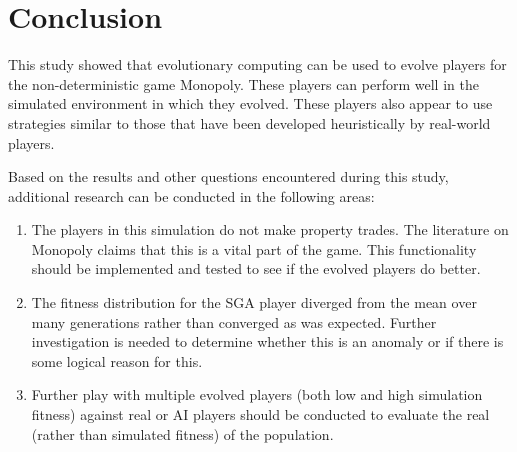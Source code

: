 \clearpage
\chapter{Conclusion}\label{chap:conclusion}

This study showed that evolutionary computing can be used to evolve players for
the non-deterministic game Monopoly. These players can perform well in the
simulated environment in which they evolved. These players also appear to use
strategies similar to those that have been developed heuristically by real-world
players.

Based on the results and other questions encountered during this study,
additional research can be conducted in the following areas:

\begin{enumerate}
  \item The players in this simulation do not make property trades. The
  literature on Monopoly claims that this is a vital part of the game. This
  functionality should be implemented and tested to see if the evolved players
  do better.
  \item The fitness distribution for the SGA player diverged from the mean over
  many generations rather than converged as was expected. Further investigation
  is needed to determine whether this is an anomaly or if there is some logical
  reason for this.
  \item Further play with multiple evolved players (both low and high simulation
  fitness) against real or AI players should be conducted to evaluate the real
  (rather than simulated fitness) of the population.
\end{enumerate}
